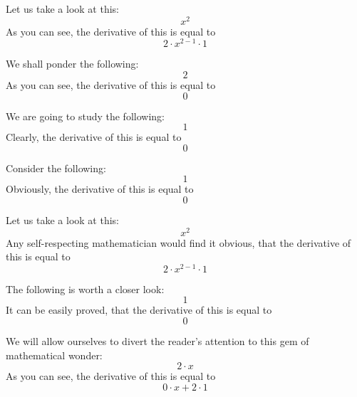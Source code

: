 \documentclass{article}
\begin{document}
Let us take a look at this:
\begin{equation}
x ^{2 } 
\end{equation}
As you can see, the derivative of this is equal to
\begin{equation}
2 \cdot x ^{2 - 1 } \cdot 1 
\end{equation}

We shall ponder the following:
\begin{equation}
2 
\end{equation}
As you can see, the derivative of this is equal to
\begin{equation}
0 
\end{equation}

We are going to study the following:
\begin{equation}
1 
\end{equation}
Clearly, the derivative of this is equal to
\begin{equation}
0 
\end{equation}

Consider the following:
\begin{equation}
1 
\end{equation}
Obviously, the derivative of this is equal to
\begin{equation}
0 
\end{equation}

Let us take a look at this:
\begin{equation}
x ^{2 } 
\end{equation}
Any self-respecting mathematician would find it obvious, that the derivative of this is equal to
\begin{equation}
2 \cdot x ^{2 - 1 } \cdot 1 
\end{equation}

The following is worth a closer look:
\begin{equation}
1 
\end{equation}
It can be easily proved, that the derivative of this is equal to
\begin{equation}
0 
\end{equation}

We will allow ourselves to divert the reader's attention to this gem of mathematical wonder:
\begin{equation}
2 \cdot x 
\end{equation}
As you can see, the derivative of this is equal to
\begin{equation}
0 \cdot x + 2 \cdot 1 
\end{equation}
\end{document}
